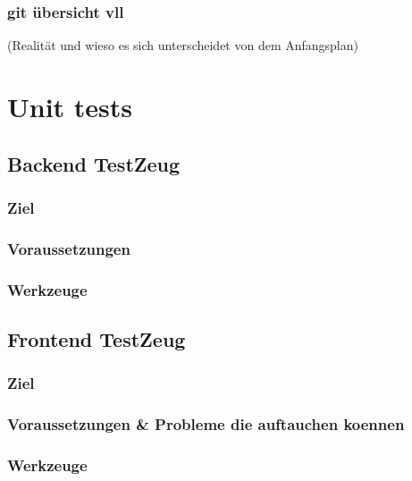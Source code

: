 \documentclass[parskip=full,11pt,twoside]{scrartcl}
\begin{document}
\subsubsection{git übersicht vll}
 (Realität und wieso es sich unterscheidet von dem Anfangsplan)
\newpage

\section{Unit tests}

\subsection{Backend TestZeug}
\subsubsection{Ziel}
\subsubsection{Voraussetzungen}
\subsubsection{Werkzeuge}
\subsection{Frontend TestZeug}
\subsubsection{Ziel}
\subsubsection{Voraussetzungen \& Probleme die auftauchen koennen}
\subsubsection{Werkzeuge}
\newpage
\end{document}
